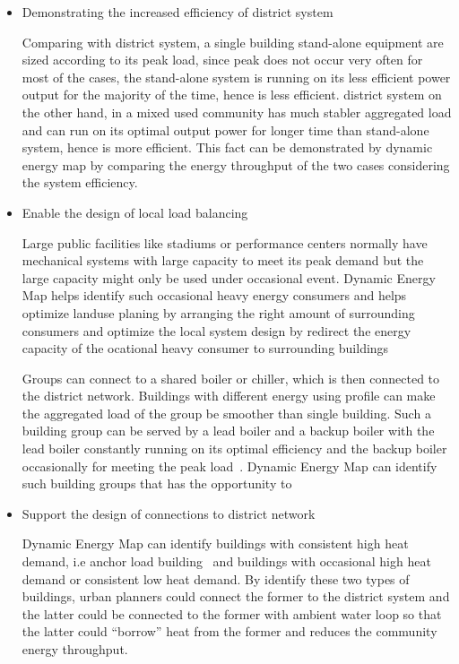 \documentclass[hidelinks,12pt]{article}
\begin{document}
\begin{itemize}
\item Demonstrating the increased efficiency of district system
  
  Comparing with district system, a single building stand-alone
  equipment are sized according to its peak load, since peak does not
  occur very often for most of the cases, the stand-alone system is
  running on its less efficient power output for the majority of the
  time, hence is less efficient. district system on the other hand, in
  a mixed used community has much stabler aggregated load and can run
  on its optimal output power for longer time than stand-alone system,
  hence is more efficient. This fact can be demonstrated by dynamic
  energy map by comparing the energy throughput of the two cases
  considering the system efficiency.

\item Enable the design of local load balancing

  Large public facilities like stadiums or performance centers
  normally have mechanical systems with large capacity to meet its
  peak demand but the large capacity might only be used under
  occasional event. Dynamic Energy Map helps identify such
  occasional heavy energy consumers and helps optimize landuse
  planing by arranging the right amount of surrounding consumers and
  optimize the local system design by redirect the energy capacity of
  the ocational heavy consumer to surrounding
  buildings~\cite{IDEA2012}
  
  Groups can connect to a shared boiler or chiller, which is then
  connected to the district network. Buildings with different energy
  using profile can make the aggregated load of the group be smoother
  than single building. Such a building group can be served by a lead
  boiler and a backup boiler with the lead boiler constantly running
  on its optimal efficiency and the backup boiler occasionally for
  meeting the peak load~\cite{IDEA2012}. Dynamic Energy Map can
  identify such building groups that has the opportunity to

\item Support the design of connections to district network

  Dynamic Energy Map can identify buildings with consistent high heat
  demand, i.e anchor load building~\cite{IDEA2012} and buildings with
  occasional high heat demand or consistent low heat demand. By
  identify these two types of buildings, urban planners could connect
  the former to the district system and the latter could be connected
  to the former with ambient water loop so that the latter could
  ``borrow'' heat from the former and reduces the community energy
  throughput.


\end{itemize}
\end{document}
